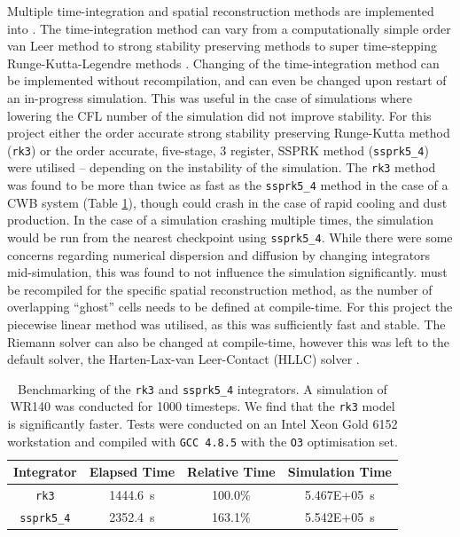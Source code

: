 Multiple time-integration and spatial reconstruction methods are implemented into \athena{}.
The time-integration method can vary from a computationally simple  order van Leer \parencite{vanleerUltimateConservativeDifference1979} method to strong stability preserving methods \parencite{ruuthHighOrderStrongStabilityPreservingRungeKutta2005} to super time-stepping Runge-Kutta-Legendre methods \parencite{meyerStabilizedRungeKuttaLegendreMethod2014}.
Changing of the time-integration method can be implemented without recompilation, and can even be changed upon restart of an in-progress simulation.
This was useful in the case of simulations where lowering the CFL number of the simulation did not improve stability.
For this project either the  order accurate strong stability preserving Runge-Kutta method (\texttt{rk3}) or the  order accurate, five-stage, 3 register, SSPRK method (\texttt{ssprk5\_4}) were utilised -- depending on the instability of the simulation.
The \texttt{rk3} method was found to be more than twice as fast as the \texttt{ssprk5\_4} method in the case of a CWB system (Table \ref{tab:rkssprkcomparison}), though could crash in the case of rapid cooling and dust production.
In the case of a simulation crashing multiple times, the simulation would be run from the nearest checkpoint using \texttt{ssprk5\_4}.
While there were some concerns regarding numerical dispersion and diffusion by changing integrators mid-simulation, this was found to not influence the simulation significantly.
\athena{} must be recompiled for the specific spatial reconstruction method, as the number of overlapping ``ghost'' cells needs to be defined at compile-time.
For this project the piecewise linear method was utilised, as this was sufficiently fast and stable.
The Riemann solver can also be changed at compile-time, however this was left to the default solver, the Harten-Lax-van Leer-Contact (HLLC) solver \parencite{toroRestorationContactSurface1994}.

\begin{table}[h]
  \centering
  \begin{tabular}{cccc}
  \hline
  Integrator & Elapsed Time & Relative Time & Simulation Time \\ \hline
  \texttt{rk3}       & \SI{1444.6}{\second} & 100.0\% & \SI{5.467E+05}{\second}\\
  \texttt{ssprk5\_4} & \SI{2352.4}{\second} & 163.1\% & \SI{5.542E+05}{\second}\\ \hline
  \end{tabular}
  \caption[Benchmarking of the  \texttt{rk3} and \texttt{ssprk5\_4} integrators]{Benchmarking of the \texttt{rk3} and \texttt{ssprk5\_4} integrators. A simulation of WR140 was conducted for \num{1000} timesteps. We find that the \texttt{rk3} model is significantly faster. Tests were conducted on an Intel Xeon Gold 6152 workstation and compiled with \texttt{GCC 4.8.5} with the \texttt{O3} optimisation set.}
  \label{tab:rkssprkcomparison}
\end{table}



